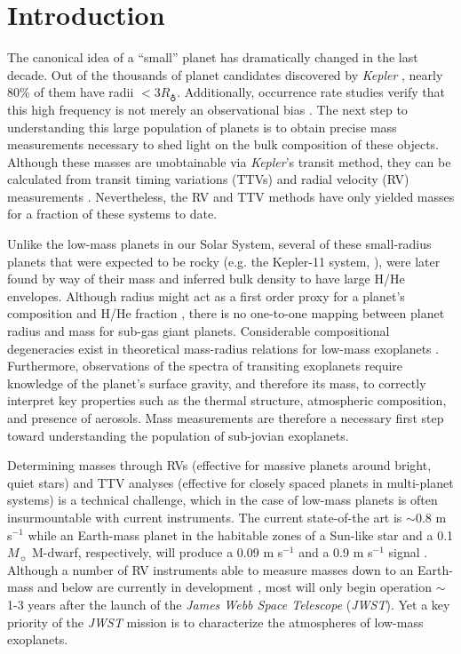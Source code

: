 \documentclass[iop]{emulateapj}
\begin{document}
\section{Introduction}
The canonical idea of a “small” planet has dramatically changed in the last decade. Out of the thousands of planet candidates discovered by \emph{Kepler} \citep{mul15}, nearly 80\% of them have radii $<3 R_\earth$. Additionally, occurrence rate studies verify that this high frequency is not merely an observational bias \citep{dre13,pet13,mor14,sil15}. The next step to understanding this large population of planets is to obtain precise mass measurements necessary to shed light on the bulk composition of these objects. Although these masses are unobtainable via \emph{Kepler}'s transit method, they can be calculated from transit timing variations (TTVs) \citep[e.g.][]{lis11,lis13,car12,jon14,mas14,jon16} and radial velocity (RV) measurements \citep[e.g.][]{bat11,wei13,how13,dre15}. Nevertheless, the RV and TTV methods have only yielded masses for a fraction of these systems to date. 

Unlike the low-mass planets in our Solar System, several of these small-radius planets that were expected to be rocky (e.g. the Kepler-11 system, \citet{lis13}), were later found by way of their mass and inferred bulk density to have large H/He envelopes.  Although radius might act as a first order proxy for a planet's composition and H/He fraction \citep{lop14,rog15}, there is no one-to-one mapping between planet radius and mass for sub-gas giant planets.  Considerable compositional degeneracies exist in theoretical mass-radius relations for low-mass exoplanets \citep{for07,sea07}.  Furthermore, observations of the spectra of transiting exoplanets require knowledge of the planet's surface gravity, and therefore its mass, to correctly interpret key properties such as the thermal structure, atmospheric composition, and presence of aerosols. Mass measurements are therefore a necessary first step toward understanding the population of sub-jovian exoplanets. 

Determining masses through RVs (effective for massive planets around bright, quiet stars) and TTV analyses (effective for closely spaced planets in multi-planet systems) is a technical challenge, which in the case of low-mass planets is often insurmountable with current instruments. The current state-of-the art is $\sim$0.8 m s$^{-1}$ while an Earth-mass planet in the habitable zones of a Sun-like star and a 0.1 $M_\sun$ M-dwarf, respectively, will produce a 0.09 m s$^{-1}$ and a 0.9 m s$^{-1}$ signal \citep{fis16}. Although a number of RV instruments able to measure masses down to an Earth-mass and below are currently in development  \citep[see][]{fis16}, most will only begin operation $\sim$1-3 years after the launch of the \emph{James Webb Space Telescope} (\emph{JWST}). Yet a key priority of the \emph{JWST} mission is to characterize the atmospheres of low-mass exoplanets.
\end{document}
